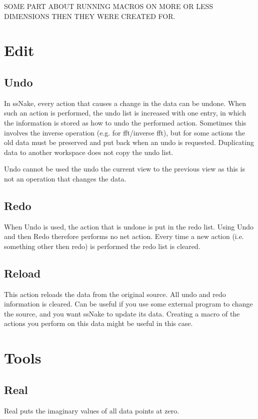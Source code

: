 \documentclass[11pt,a4paper]{article}
\begin{document}
SOME PART ABOUT RUNNING MACROS ON MORE OR LESS DIMENSIONS THEN THEY WERE CREATED FOR.




\section{Edit}
\subsection{Undo}
In ssNake, every action that causes a change in the data can be undone. When such an action is performed, the undo list is increased with one entry, in which the information is stored as how to undo the performed action. Sometimes this involves the inverse operation (e.g. for fft/inverse fft), but for some actions the old data must be preserved and put back when an undo is requested. Duplicating data to another workspace does not copy the undo list.

Undo cannot be used the undo the current view to the previous view as this is not an operation that changes the data.

\subsection{Redo}
When Undo is used, the action that is undone is put in the redo list. Using Undo and then Redo therefore performs no net action. Every time a new action (i.e. something other then redo) is performed the redo list is cleared.

\subsection{Reload}
This action reloads the data from the original source. All undo and redo information is cleared. Can be useful if you use some external program to change the source, and you want ssNake to update its data. Creating a macro of the actions you perform on this data might be useful in this case.

\section{Tools}

\subsection{Real}
Real puts the imaginary values of all data points at zero.
\end{document}
